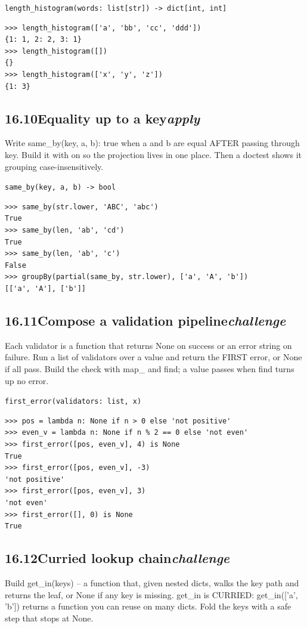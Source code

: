\documentclass[10pt,letterpaper]{book}
\begin{document}
\noindent\texttt{length\_histogram(words: list[str]) -> dict[int, int]}
\begin{lstlisting}[style=ex]
>>> length_histogram(['a', 'bb', 'cc', 'ddd'])
{1: 1, 2: 2, 3: 1}
>>> length_histogram([])
{}
>>> length_histogram(['x', 'y', 'z'])
{1: 3}
\end{lstlisting}
\subsection*{16.10\quad Equality up to a key\hfill\textnormal{\textit{apply}}}
Write same\_by(key, a, b): true when a and b are equal AFTER passing through key. Build it with on so the projection lives in one place. Then a doctest shows it grouping case-insensitively.

\noindent\texttt{same\_by(key, a, b) -> bool}
\begin{lstlisting}[style=ex]
>>> same_by(str.lower, 'ABC', 'abc')
True
>>> same_by(len, 'ab', 'cd')
True
>>> same_by(len, 'ab', 'c')
False
>>> groupBy(partial(same_by, str.lower), ['a', 'A', 'b'])
[['a', 'A'], ['b']]
\end{lstlisting}
\subsection*{16.11\quad Compose a validation pipeline\hfill\textnormal{\textit{challenge}}}
Each validator is a function that returns None on success or an error string on failure. Run a list of validators over a value and return the FIRST error, or None if all pass. Build the check with map\_ and find; a value passes when find turns up no error.

\noindent\texttt{first\_error(validators: list, x)}
\begin{lstlisting}[style=ex]
>>> pos = lambda n: None if n > 0 else 'not positive'
>>> even_v = lambda n: None if n % 2 == 0 else 'not even'
>>> first_error([pos, even_v], 4) is None
True
>>> first_error([pos, even_v], -3)
'not positive'
>>> first_error([pos, even_v], 3)
'not even'
>>> first_error([], 0) is None
True
\end{lstlisting}
\subsection*{16.12\quad Curried lookup chain\hfill\textnormal{\textit{challenge}}}
Build get\_in(keys) -- a function that, given nested dicts, walks the key path and returns the leaf, or None if any key is missing. get\_in is CURRIED: get\_in(['a', 'b']) returns a function you can reuse on many dicts. Fold the keys with a safe step that stops at None.
\end{document}
